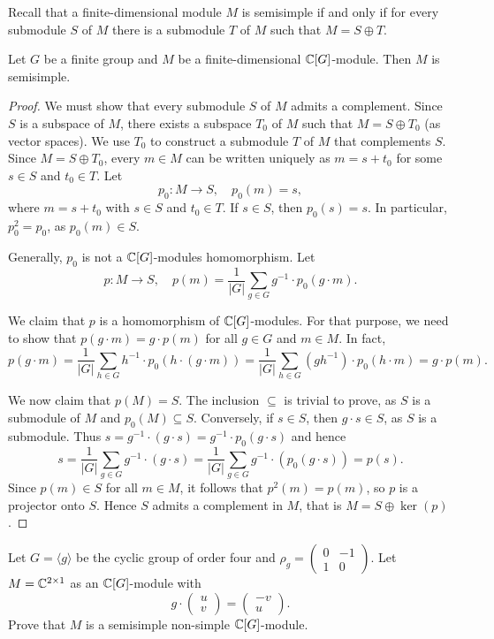 Recall that a finite-dimensional module $M$ is semisimple 
if and only if for every submodule $S$ of $M$ there 
is a submodule $T$ of $M$ such that $M=S\oplus T$.    

\begin{theorem}[Maschke]
    Let $G$ be a finite
    group and $M$ be a finite-dimensional $\mathbb{C}[G]$-module.
    Then $M$ is semisimple. 
\end{theorem}

\begin{proof}
We must show that every submodule $S$ of $M$ admits a complement. 
Since $S$ is a subspace of $M$, there exists a subspace $T_0$ of $M$ 
such that $M=S\oplus T_0$ (as vector spaces). We use 
$T_0$ to construct a submodule $T$ of $M$ that complements $S$. Since $M=S\oplus T_0$, 
every $m\in M$ can be written uniquely as $m=s+t_0$ for some $s\in S$ and $t_0\in T$. 
Let 
\[
p_0\colon M\to S,\quad
p_0(m)=s,
\]
where $m=s+t_0$ with $s\in S$ and $t_0\in T$. 
If $s\in S$, then $p_0(s)=s$. In particular, $p_0^2=p_0$, as 
$p_0(m)\in S$. 

Generally, $p_0$ is not a $\mathbb{C}[G]$-modules homomorphism. 
Let 
\[
p\colon M\to S,\quad
p(m)=\frac{1}{|G|}\sum_{g\in G}g^{-1}\cdot p_0(g\cdot m).
\]

We claim that $p$ is a homomorphism of $\mathbb{C}[G]$-modules. For that purpose, we need to show that 
$p(g\cdot m)=g\cdot p(m)$ for all $g\in G$ and $m\in M$. In fact, 
\[
p(g\cdot m)=\frac{1}{|G|}\sum_{h\in G}h^{-1}\cdot p_0(h\cdot (g\cdot m))
=\frac{1}{|G|}\sum_{h\in G}(gh^{-1})\cdot p_0(h\cdot m)=g\cdot p(m).
\]

We now claim that $p(M)=S$. The inclusion $\subseteq$ is trivial to prove, as $S$ is a submodule of $M$ 
and $p_0(M)\subseteq S$. Conversely, if $s\in S$, then $g\cdot s\in S$, as 
$S$ is a submodule. Thus 
$s=g^{-1}\cdot (g\cdot s)=g^{-1}\cdot p_0(g\cdot s)$ and hence 
\[
s=\frac{1}{|G|}\sum_{g\in G}g^{-1}\cdot (g\cdot s)=\frac{1}{|G|}\sum_{g\in G}g^{-1}\cdot (p_0(g\cdot s))=p(s).
\]
Since $p(m)\in S$ for all $m\in M$, it follows that $p^2(m)=p(m)$, so $p$ is a projector onto $S$. 
Hence $S$ admits a complement in $M$, that is $M=S\oplus\ker(p)$.
\end{proof}

\begin{exercise}
Let $G=\langle g\rangle$ be the cyclic group 
of order four and $\rho_g=\begin{pmatrix}
0&-1\\
1&0\end{pmatrix}$. 
Let $M=\mathbb{C}^{2\times 1}$ as an $\mathbb{C}[G]$-module with 
\[
g\cdot\begin{pmatrix}u\\v\end{pmatrix}
=\begin{pmatrix}-v\\u\end{pmatrix}.
\]
Prove that $M$ is a semisimple non-simple $\mathbb{C}[G]$-module.
\end{exercise}


